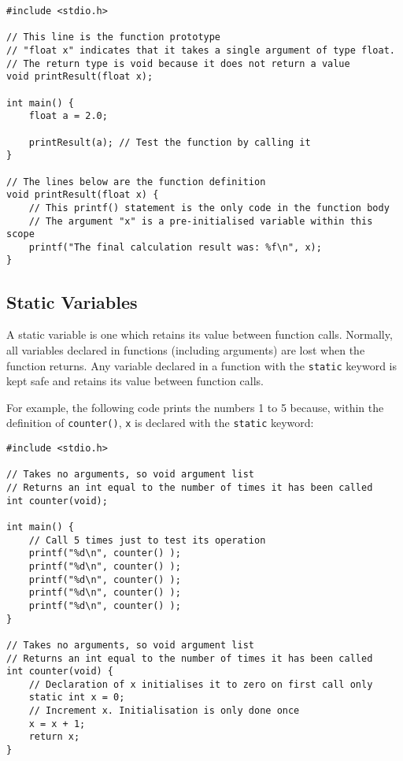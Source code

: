 \documentclass{lab}
\begin{document}
\begin{lstlisting}[style=CStyle]
#include <stdio.h>

// This line is the function prototype
// "float x" indicates that it takes a single argument of type float.
// The return type is void because it does not return a value
void printResult(float x);

int main() {
	float a = 2.0;
	
	printResult(a); // Test the function by calling it
}

// The lines below are the function definition
void printResult(float x) {
	// This printf() statement is the only code in the function body
	// The argument "x" is a pre-initialised variable within this scope
	printf("The final calculation result was: %f\n", x);
}
\end{lstlisting}

\pagebreak
\subsection{Static Variables}

A static variable is one which retains its value between function calls. Normally, all variables declared in functions (including arguments) are lost when the function returns. Any variable declared in a function with the \texttt{static} keyword is kept safe and retains its value between function calls.

For example, the following code prints the numbers 1 to 5 because, within the definition of \texttt{counter()}, \texttt{x} is declared with the \texttt{static} keyword:

\begin{lstlisting}[style=CStyle]
#include <stdio.h>

// Takes no arguments, so void argument list
// Returns an int equal to the number of times it has been called
int counter(void); 

int main() {
	// Call 5 times just to test its operation
	printf("%d\n", counter() );
	printf("%d\n", counter() );
	printf("%d\n", counter() );
	printf("%d\n", counter() );
	printf("%d\n", counter() );
}
	
// Takes no arguments, so void argument list
// Returns an int equal to the number of times it has been called
int counter(void) {
	// Declaration of x initialises it to zero on first call only
	static int x = 0;
	// Increment x. Initialisation is only done once
	x = x + 1;
	return x;
}
\end{lstlisting}
\end{document}
